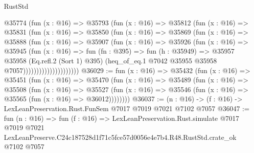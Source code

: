 \begin{lexlean}{RustStd}
\begin{coremodule}
                      @35774
                        (fun (x : @16) =>
                        @35793
                          (fun (x : @16) =>
                          @35812
                            (fun (x : @16) =>
                            @35831
                              (fun (x : @16) =>
                              @35850
                                (fun (x : @16) =>
                                @35869
                                  (fun (x : @16) =>
                                  @35888
                                    (fun (x : @16) =>
                                    @35907
                                      (fun (x : @16) =>
                                      @35926
                                        (fun (x : @16) =>
                                        @35945
                                          (fun (x : @16) =>
                                          fun (fn : @395) =>
                                          fun (h : @35949) =>
                                          @35957
                                            @35958
                                            (Eq.refl.{2} (Sort 1) @395)
                                            (heq_of_eq.{1}
                                              @7042
                                              @35955
                                              @35958
                                              @7057)))))))))))))))))))))
@36029 := fun (x : @16) =>
  @35432
    (fun (x : @16) =>
    @35451
      (fun (x : @16) =>
      @35470
        (fun (x : @16) =>
        @35489
          (fun (x : @16) =>
          @35508
            (fun (x : @16) =>
            @35527
              (fun (x : @16) => @35546 (fun (x : @16) => @35565 (fun (x : @16) => @36012))))))))
@36037 := (n : @16) -> (f : @16) -> LexLeanPreservation.Rust.FunSem @7017 @7019 @7021 @7102 @7057
@36047 := fun (n : @16) =>
  fun (f : @16) =>
  LexLeanPreservation.Rust.simulate
    @7017
    @7019
    @7021
    LexLeanPreserve.C24c187528d1f71c5fce57d0056e4e7b4.R48.RustStd.crate_ok
    @7102
    @7057
\end{coremodule}
\end{lexlean}

